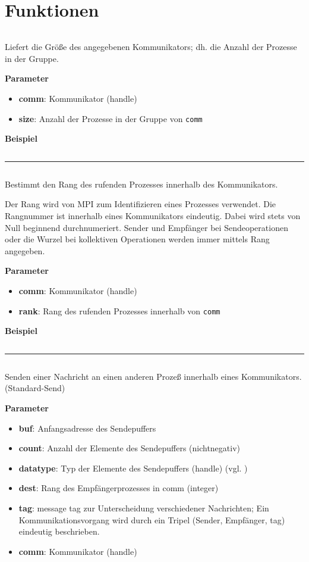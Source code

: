 \section{Funktionen}
\inputminted[numbersep=5pt, tabsize=4]{c}{scripts/mpi/comm-size.c}%
Liefert die Größe des angegebenen Kommunikators; dh. die Anzahl der Prozesse in der Gruppe.

\textbf{Parameter}
\begin{itemize}
    \item \textbf{comm}: Kommunikator (handle)
    \item \textbf{size}: Anzahl der Prozesse in der Gruppe von \texttt{comm}
\end{itemize}

\textbf{Beispiel}
\inputminted[numbersep=5pt, tabsize=4]{c}{scripts/mpi/comm-size-example.c}
\goodbreak
\rule{\textwidth}{0.4pt}%
\inputminted[numbersep=5pt, tabsize=4]{c}{scripts/mpi/comm-rank.c}
Bestimmt den Rang des rufenden Prozesses innerhalb des Kommunikators.

Der Rang wird von MPI zum Identifizieren eines Prozesses verwendet. Die Rangnummer ist innerhalb eines Kommunikators eindeutig. Dabei wird stets von Null beginnend durchnumeriert. Sender und Empfänger bei Sendeoperationen oder die Wurzel bei kollektiven Operationen werden immer mittels Rang angegeben.

\textbf{Parameter}
\begin{itemize}
    \item \textbf{comm}: Kommunikator (handle)
    \item \textbf{rank}: Rang des rufenden Prozesses innerhalb von \texttt{comm}
\end{itemize}

\textbf{Beispiel}
\inputminted[numbersep=5pt, tabsize=4]{c}{scripts/mpi/comm-rank-example.c}
\goodbreak
\rule{\textwidth}{0.4pt}%
\inputminted[numbersep=5pt, tabsize=4]{c}{scripts/mpi/mpi-send.c}
Senden einer Nachricht an einen anderen Prozeß innerhalb eines Kommunikators. (Standard-Send)

\textbf{Parameter}
\begin{itemize}
    \item \textbf{buf}: Anfangsadresse des Sendepuffers
    \item \textbf{count}: Anzahl der Elemente des Sendepuffers (nichtnegativ)
    \item \textbf{datatype}: Typ der Elemente des Sendepuffers (handle) (vgl. )
    \item \textbf{dest}: Rang des Empfängerprozesses in comm (integer)
    \item \textbf{tag}: message tag zur Unterscheidung verschiedener Nachrichten;
Ein Kommunikationsvorgang wird durch ein Tripel (Sender, Empfänger, tag) eindeutig beschrieben.
    \item \textbf{comm}: Kommunikator (handle)
\end{itemize}

